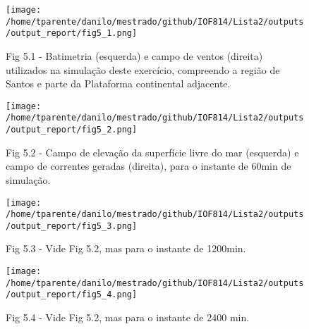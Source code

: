 \documentclass[11pt]{article}
\makeatletter
\def\maxwidth{\ifdim\Gin@nat@width>\linewidth\linewidth
    \else\Gin@nat@width\fi}
\let\Oldincludegraphics\includegraphics
\renewcommand{\includegraphics}[1]{\Oldincludegraphics[width=.8\maxwidth]{#1}}
\makeatother
\begin{document}
\begin{figure}
\centering
\centerline{\hbox{\texttt{[image: /home/tparente/danilo/mestrado/github/IOF814/Lista2/outputs/output\_report/fig5\_1.png]}}}
\caption{Fig 5.1 - Batimetria (esquerda) e campo de ventos (direita) utilizados na
simulação deste exercício, compreendo a região de Santos e parte da Plataforma
continental adjacente.}
\label{fig5:1}
\end{figure}

\begin{figure}
\centering
\centerline{\hbox{\texttt{[image: /home/tparente/danilo/mestrado/github/IOF814/Lista2/outputs/output\_report/fig5\_2.png]}}}
\caption{Fig 5.2 - Campo de elevação da superfície livre do mar (esquerda) e campo de correntes
geradas (direita), para o instante de 60min de simulação.}
\label{fig5:2}
\end{figure}

\begin{figure}
\centering
\centerline{\hbox{\texttt{[image: /home/tparente/danilo/mestrado/github/IOF814/Lista2/outputs/output\_report/fig5\_3.png]}}}
\caption{Fig 5.3 - Vide Fig 5.2, mas para o instante de 1200min.}
\label{fig5:3}
\end{figure}

\bigskip
\begin{figure}
\centerline{\hbox{\texttt{[image: /home/tparente/danilo/mestrado/github/IOF814/Lista2/outputs/output\_report/fig5\_4.png]}}}
\caption{Fig 5.4 -  Vide Fig 5.2, mas para o instante de 2400 min.}
\label{fig5:4}
\end{figure}
\bigskip


    
\end{document}
